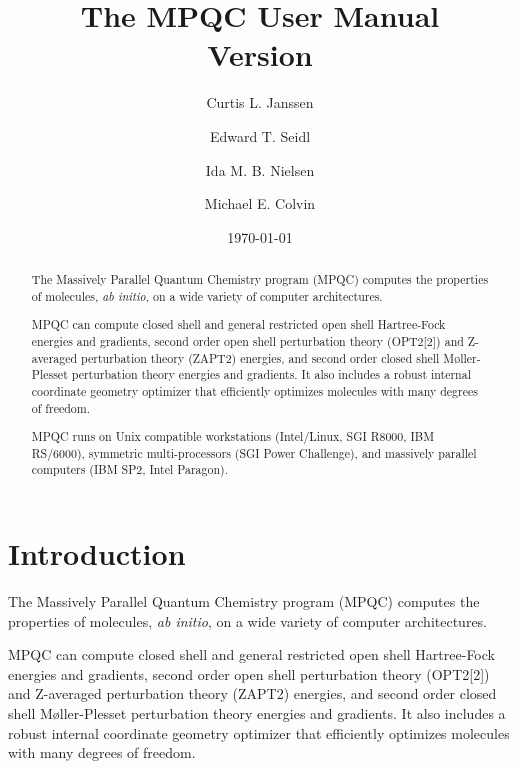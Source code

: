 \documentclass[letterpaper%
              ]{report}
\begin{document}
\title{The MPQC User Manual \\
       Version }

\author{Curtis L. Janssen \and Edward T. Seidl \and Ida M. B. Nielsen
        \and Michael E. Colvin}

\date{\today}

\maketitle

\begin{abstract}
The Massively Parallel Quantum Chemistry program (MPQC) computes
the properties of molecules, {\it ab initio}, on a wide variety
of computer architectures.

\begin{sloppypar}
MPQC can compute closed shell and general restricted open shell
Hartree-Fock energies and gradients, second order open shell
perturbation theory (OPT2[2]) and Z-averaged perturbation theory
(ZAPT2) energies, and second order closed shell M\o{}ller-Plesset
perturbation theory energies and gradients.  It also includes a
robust internal coordinate geometry optimizer that efficiently
optimizes molecules with many degrees of freedom.
\end{sloppypar}

MPQC runs on Unix compatible workstations (Intel/Linux, SGI R8000,
IBM RS/6000), symmetric multi-processors (SGI Power Challenge), and
massively parallel computers (IBM SP2, Intel Paragon).
\end{abstract}

\tableofcontents
\listoftables

\chapter{Introduction}
The Massively Parallel Quantum Chemistry program (MPQC) computes
the properties of molecules, {\it ab initio}, on a wide variety
of computer architectures.

MPQC can compute closed shell and general restricted open shell
Hartree-Fock energies and gradients, second order open shell
perturbation theory (OPT2[2]) and Z-averaged perturbation theory
(ZAPT2) energies, and second order closed shell M\o{}ller-Plesset
perturbation theory energies and gradients.  It also includes a
robust internal coordinate geometry optimizer that efficiently
optimizes molecules with many degrees of freedom.
\end{document}
